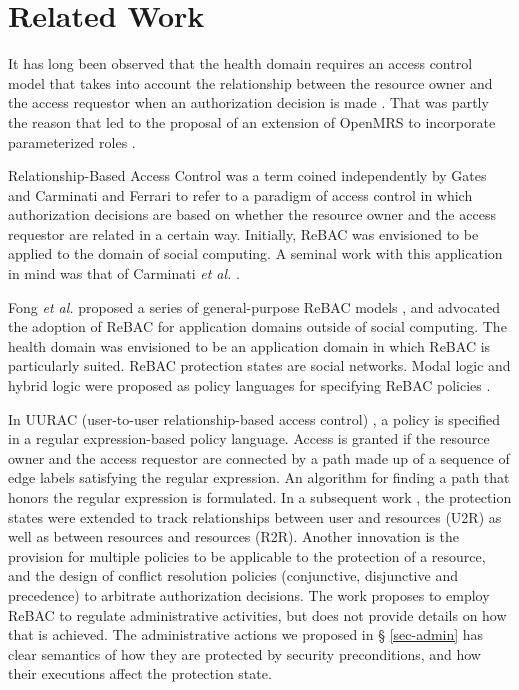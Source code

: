 \documentclass{acm_proc_article-sp}
\begin{document}
\section{Related Work}

It has long been observed that the health domain requires an access
control model that takes into account the relationship between the
resource owner and the access requestor when an authorization decision
is made \cite{Beznosov,Rostad-Edsberg}.  That was partly the reason
that led to the proposal of an extension of OpenMRS to incorporate
parameterized roles \cite{Fischer-et-al:2009}.

Relationship-Based Access Control was a term coined independently by
Gates \cite{Gates:2007} and Carminati and Ferrari
\cite{Carminati-Ferrari:2009} to refer to a paradigm of access control
in which authorization decisions are based on whether the resource
owner and the access requestor are related in a certain way.
Initially, ReBAC was envisioned to be applied to the domain of social
computing.  A seminal work with this application in mind was that of
Carminati \emph{et al.} \cite{Carminati-etal:2009}.

Fong \emph{et al.} proposed a series of general-purpose ReBAC models
\cite{Fong:2011, Fong-Siahaan:2011, Bruns-etal:2012}, and advocated
the adoption of ReBAC for application domains outside of social
computing.  The health domain was envisioned to be an application
domain in which ReBAC is particularly suited.  ReBAC protection states
are social networks.  Modal logic and hybrid logic were proposed as
policy languages for specifying ReBAC policies \cite{Fong:2011,
  Fong-Siahaan:2011, Bruns-etal:2012}.

In UURAC (user-to-user relationship-based access control)
\cite{Cheng-et-al:2012a}, a policy is specified in a regular
expression-based policy language.  Access is granted if the resource
owner and the access requestor are connected by a path made up of a
sequence of edge labels satisfying the regular expression.  An
algorithm for finding a path that honors the regular expression is
formulated.  In a subsequent work \cite{Cheng-et-al:2012b}, the 
protection states were extended to track relationships between user
and resources (U2R) as well as between resources and resources (R2R).
Another innovation is the provision for multiple policies to be
applicable to the protection of a resource, and the design of conflict
resolution policies (conjunctive, disjunctive and precedence) to
arbitrate authorization decisions.  The work proposes to employ ReBAC
to regulate administrative activities, but does not provide details on
how that is achieved.  The administrative actions we proposed in \S
\ref{sec-admin} has clear semantics of how they are protected by
security preconditions, and how their executions affect the protection
state.
\end{document}
